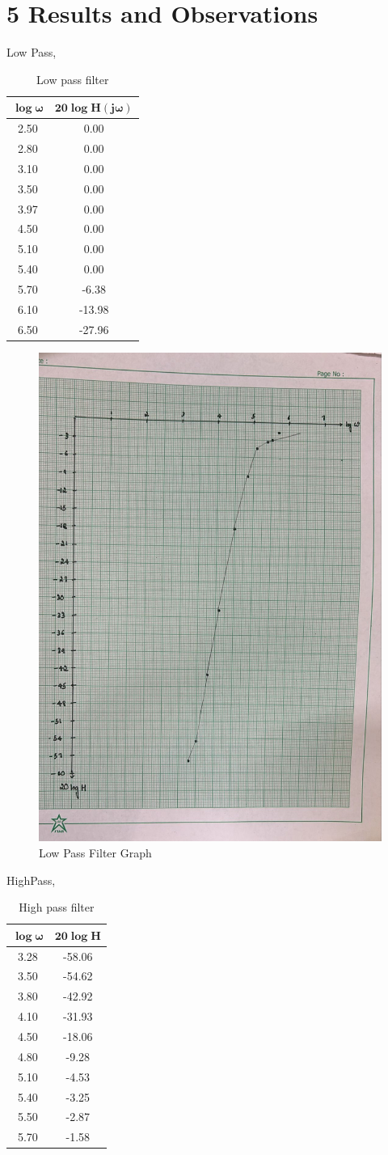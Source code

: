 \documentclass{article}
\begin{document}
\section*{5 Results and Observations}

Low Pass,
\begin{table}[h!]
\centering
\begin{tabular}{|c|c|}
\hline
$\mathbf{\log{\omega}}$ & $\mathbf{20\log{H(j\omega)}}$ \\
\hline
2.50 & 0.00 \\
2.80 & 0.00 \\
3.10 & 0.00 \\
3.50 & 0.00 \\
3.97 & 0.00 \\
4.50 & 0.00 \\
5.10 & 0.00 \\
5.40 & 0.00 \\
5.70 & -6.38 \\
6.10 & -13.98 \\
6.50 & -27.96 \\
\hline
\end{tabular}
\caption{Low pass filter}
\end{table}
\begin{figure}[h!]
    \centering
    \includegraphics[width=0.5\linewidth]{figs/lowpass_graph.jpeg}
    \caption{Low Pass Filter Graph}
    \label{fig:enter-label}
\end{figure}
HighPass,
\begin{table}[h!]
\centering
\begin{tabular}{|c|c|}
\hline
$\mathbf{\log{\omega}}$ & $\mathbf{20\log{H}}$ \\
\hline
3.28 & -58.06 \\
3.50 & -54.62 \\
3.80 & -42.92 \\
4.10 & -31.93 \\
4.50 & -18.06 \\
4.80 & -9.28 \\
5.10 & -4.53 \\
5.40 & -3.25 \\
5.50 & -2.87 \\
5.70 & -1.58 \\
\hline
\end{tabular}
\caption{High pass filter}
\end{table}
\end{document}
